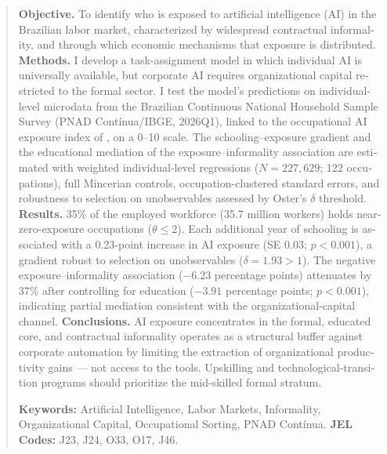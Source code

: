 \begin{abstract}
\begin{otherlanguage}{english}
\textbf{Objective.} To identify who is exposed to artificial intelligence (AI) in the Brazilian labor market, characterized by widespread contractual informality, and through which economic mechanisms that exposure is distributed. \textbf{Methods.} I develop a task-assignment model in which individual AI is universally available, but corporate AI requires organizational capital restricted to the formal sector. I test the model's predictions on individual-level microdata from the Brazilian Continuous National Household Sample Survey (PNAD Contínua/IBGE, 2026Q1), linked to the occupational AI exposure index of \citet{eloundou2024gpts}, on a 0--10 scale. The schooling--exposure gradient and the educational mediation of the exposure--informality association are estimated with weighted individual-level regressions ($N = 227{,}629$; 122 occupations), full Mincerian controls, occupation-clustered standard errors, and robustness to selection on unobservables assessed by Oster's $\delta$ threshold. \textbf{Results.} 35\% of the employed workforce (35.7 million workers) holds near-zero-exposure occupations ($\theta \le 2$). Each additional year of schooling is associated with a 0.23-point increase in AI exposure (SE 0.03; $p < 0.001$), a gradient robust to selection on unobservables ($\delta = 1.93 > 1$). The negative exposure--informality association ($-6.23$ percentage points) attenuates by 37\% after controlling for education ($-3.91$ percentage points; $p < 0.001$), indicating partial mediation consistent with the organizational-capital channel. \textbf{Conclusions.} AI exposure concentrates in the formal, educated core, and contractual informality operates as a structural buffer against corporate automation by limiting the extraction of organizational productivity gains --- not access to the tools. Upskilling and technological-transition programs should prioritize the mid-skilled formal stratum.\par
\vspace{0.3em}
\noindent \textbf{Keywords:} Artificial Intelligence, Labor Markets, Informality, Organizational Capital, Occupational Sorting, PNAD Contínua. \textbf{JEL Codes:} J23, J24, O33, O17, J46.\par
\end{otherlanguage}
\end{abstract}
\newpage

